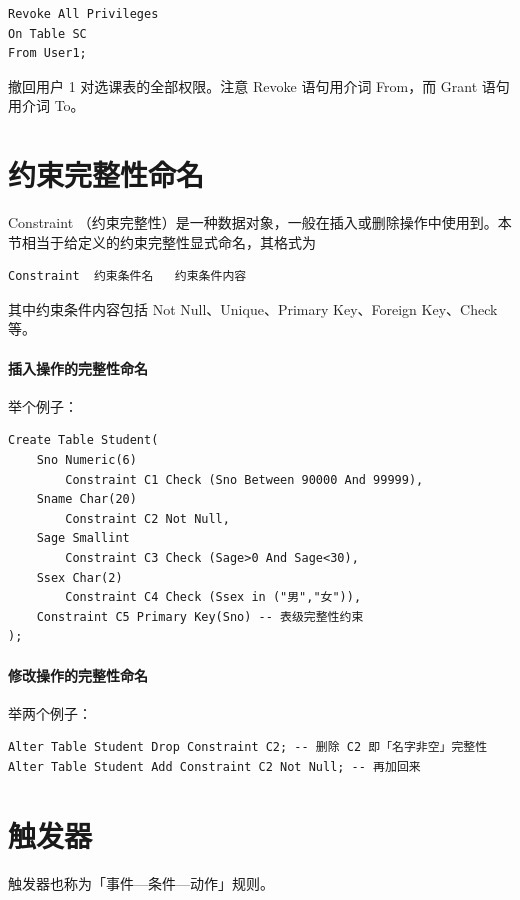 \documentclass[UTF8]{ctexart}
\begin{document}
\begin{lstlisting}[backgroundcolor=\color{white}]
Revoke All Privileges
On Table SC
From User1;
\end{lstlisting}
撤回用户 1 对选课表的全部权限。注意 Revoke 语句用介词 From，而 Grant 语句用介词 To。

\section{约束完整性命名}
Constraint （约束完整性）是一种数据对象，一般在插入或删除操作中使用到。本节相当于给定义的约束完整性显式命名，其格式为
\begin{lstlisting}
Constraint  约束条件名   约束条件内容
\end{lstlisting}
其中约束条件内容包括 Not Null、Unique、Primary Key、Foreign Key、Check 等。

\paragraph{插入操作的完整性命名} 举个例子：
\begin{lstlisting}[backgroundcolor=\color{white}]
Create Table Student(
    Sno Numeric(6)
        Constraint C1 Check (Sno Between 90000 And 99999),
    Sname Char(20)
        Constraint C2 Not Null,
    Sage Smallint
        Constraint C3 Check (Sage>0 And Sage<30),
    Ssex Char(2)
        Constraint C4 Check (Ssex in ("男","女")),
    Constraint C5 Primary Key(Sno) -- 表级完整性约束
);
\end{lstlisting}

\paragraph{修改操作的完整性命名} 举两个例子：
\begin{lstlisting}[backgroundcolor=\color{white}]
Alter Table Student Drop Constraint C2; -- 删除 C2 即「名字非空」完整性
Alter Table Student Add Constraint C2 Not Null; -- 再加回来
\end{lstlisting}

\section{触发器}
触发器也称为「事件—条件—动作」规则。
\end{document}
